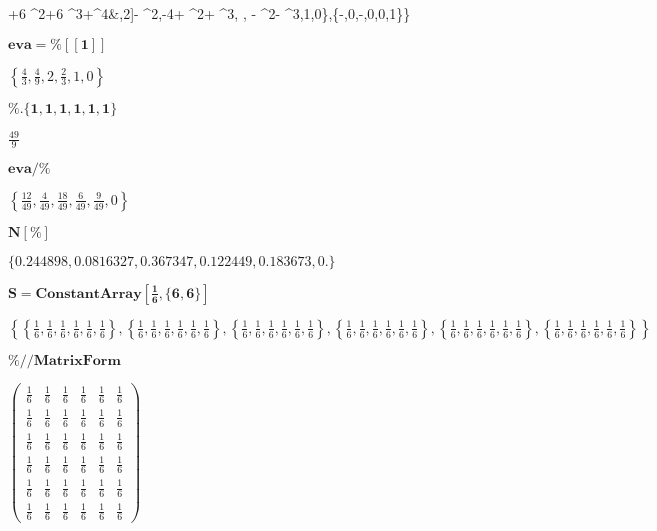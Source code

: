 \documentclass{article}
\begin{document}
+6 ^2+6 ^3+^4\&,2\right]- ^2,-4+
^2+ ^3, ,
- ^2- ^3,1,0\right\},\left\{-,0,-,0,0,1\right\}\right\}\)

\noindent\(\pmb{\text{eva}=\%[[1]]}\)

\noindent\(\left\{\frac{4}{3},\frac{4}{9},2,\frac{2}{3},1,0\right\}\)

\noindent\(\pmb{\%.\{1,1,1,1,1,1\}}\)

\noindent\(\frac{49}{9}\)

\noindent\(\pmb{\text{eva}/\%}\)

\noindent\(\left\{\frac{12}{49},\frac{4}{49},\frac{18}{49},\frac{6}{49},\frac{9}{49},0\right\}\)

\noindent\(\pmb{N[\%]}\)

\noindent\(\{0.244898,0.0816327,0.367347,0.122449,0.183673,0.\}\)

\noindent\(\pmb{S=\text{ConstantArray}\left[\frac{1}{6},\{6,6\}\right]}\)

\noindent\(\left\{\left\{\frac{1}{6},\frac{1}{6},\frac{1}{6},\frac{1}{6},\frac{1}{6},\frac{1}{6}\right\},\left\{\frac{1}{6},\frac{1}{6},\frac{1}{6},\frac{1}{6},\frac{1}{6},\frac{1}{6}\right\},\left\{\frac{1}{6},\frac{1}{6},\frac{1}{6},\frac{1}{6},\frac{1}{6},\frac{1}{6}\right\},\left\{\frac{1}{6},\frac{1}{6},\frac{1}{6},\frac{1}{6},\frac{1}{6},\frac{1}{6}\right\},\left\{\frac{1}{6},\frac{1}{6},\frac{1}{6},\frac{1}{6},\frac{1}{6},\frac{1}{6}\right\},\left\{\frac{1}{6},\frac{1}{6},\frac{1}{6},\frac{1}{6},\frac{1}{6},\frac{1}{6}\right\}\right\}\)

\noindent\(\pmb{\%\text{//}\text{MatrixForm}}\)

\noindent\(\left(
\begin{array}{cccccc}
 \frac{1}{6} & \frac{1}{6} & \frac{1}{6} & \frac{1}{6} & \frac{1}{6} & \frac{1}{6} \\
 \frac{1}{6} & \frac{1}{6} & \frac{1}{6} & \frac{1}{6} & \frac{1}{6} & \frac{1}{6} \\
 \frac{1}{6} & \frac{1}{6} & \frac{1}{6} & \frac{1}{6} & \frac{1}{6} & \frac{1}{6} \\
 \frac{1}{6} & \frac{1}{6} & \frac{1}{6} & \frac{1}{6} & \frac{1}{6} & \frac{1}{6} \\
 \frac{1}{6} & \frac{1}{6} & \frac{1}{6} & \frac{1}{6} & \frac{1}{6} & \frac{1}{6} \\
 \frac{1}{6} & \frac{1}{6} & \frac{1}{6} & \frac{1}{6} & \frac{1}{6} & \frac{1}{6}
\end{array}
\right)\)
\end{document}
